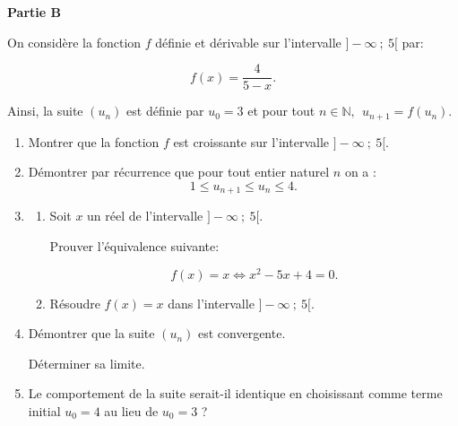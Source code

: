 \documentclass[10pt]{article}
\providecommand{\N}{\mathbb{N}}
\begin{document}
\medskip

\textbf{Partie B}

\medskip

On considère la fonction $f$ définie et dérivable sur l'intervalle $] -\infty~;~5[$ par:

\[f(x) = \dfrac{4}{5 - x}.\]

Ainsi, la suite $\left(u_n\right)$ est définie par $u_0 = 3$ et pour tout $n \in \N,\:\: u_{n+1}  = f\left(u_n\right)$.

\medskip

\begin{enumerate}
\item Montrer que la fonction $f$ est croissante sur l'intervalle $]-\infty~;~5[$.
\item Démontrer par récurrence que pour tout entier naturel $n$ on a : 
\[1 \leqslant u_{n+1} \leqslant u_n \leqslant 4.\]
\item 
	\begin{enumerate}
		\item Soit $x$ un réel de l'intervalle $]-\infty~;~5[$.

Prouver l'équivalence suivante: 

\[f(x) = x \iff x^2 - 5x + 4 = 0.\]
		
		\item Résoudre $f(x) = x$ dans l'intervalle $]-\infty~;~5[$.
	\end{enumerate}	
\item Démontrer que la suite $\left(u_n\right)$ est convergente.

Déterminer sa limite.
\item Le comportement de la suite serait-il identique en choisissant comme terme initial $u_0 = 4$ au lieu de $u_0 = 3$ ?
\end{enumerate}
\end{document}
